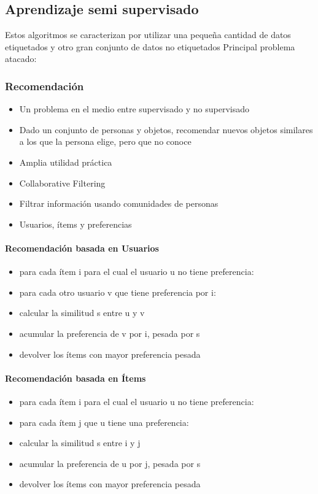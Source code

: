 \documentclass[a4paper,12pt,spanish]{book}
\begin{document}
    \subsection{Aprendizaje semi supervisado}

      Estos algoritmos se caracterizan por utilizar una pequeña cantidad de datos etiquetados y otro gran conjunto de datos no etiquetados
      Principal problema atacado:
      \subsubsection {Recomendación}
	\begin{itemize}
	  \item Un problema en el medio entre supervisado y no supervisado
	  \item Dado un conjunto de personas y objetos, recomendar nuevos objetos similares a los que la persona elige, pero que no conoce
	  \item Amplia utilidad práctica
	  \item Collaborative Filtering
	  \item Filtrar información usando comunidades de personas
	  \item Usuarios, ítems y preferencias
	\end{itemize}
      \paragraph {Recomendación basada en Usuarios}
	\begin{itemize}
	  \item para cada ítem i para el cual el usuario u no tiene preferencia:
	  \item para cada otro usuario v que tiene preferencia por i:
	  \item calcular la similitud s entre u y v
	  \item acumular la preferencia de v por i, pesada por s
	  \item devolver los ítems con mayor preferencia pesada
	\end{itemize}
      \paragraph {Recomendación basada en Ítems}
	\begin{itemize}
	  \item para cada ítem i para el cual el usuario u no tiene preferencia:
	  \item para cada ítem j que u tiene una preferencia:
	  \item calcular la similitud s entre i y j
	  \item acumular la preferencia de u por j, pesada por s
	  \item devolver los ítems con mayor preferencia pesada
	\end{itemize}
    
\end{document}
